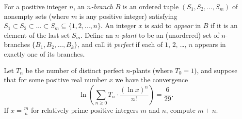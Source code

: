 For a positive integer $n$, an \textit{$n$-branch} $B$ is an ordered tuple $(S_1, S_2, \dots, S_m)$ of nonempty sets (where $m$ is any positive integer) satisfying $S_1 \subset S_2 \subset \dots \subset S_m \subseteq \{1,2,\dots,n\}$. An integer $x$ is said to \textit{appear} in $B$ if it is an element of the last set $S_m$.  Define an \textit{$n$-plant} to be an (unordered) set of $n$-branches $\{ B_1, B_2, \dots, B_k\}$, and call it \textit{perfect} if each of $1$, $2$, \dots, $n$ appears in exactly one of its branches.

Let $T_n$ be the number of distinct perfect $n$-plants (where $T_0=1$), and suppose that for some positive real number $x$ we have the convergence \[ \ln \left( \sum_{n \ge 0} T_n \cdot \frac{\left( \ln x \right)^n}{n!} \right) = \frac{6}{29}. \] If $x = \frac mn$ for relatively prime positive integers $m$ and $n$, compute $m+n$.
